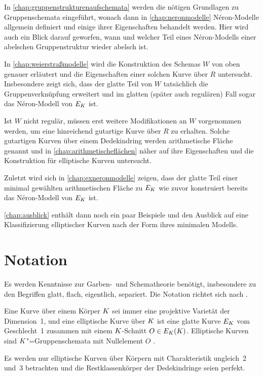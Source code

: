 In \autoref{chap:gruppenstrukturenaufschemata} werden die nötigen
Grundlagen zu Gruppenschemata eingeführt, wonach dann in
\autoref{chap:neronmodelle} Néron-Modelle allgemein definiert und
einige ihrer Eigenschaften behandelt werden.
Hier wird auch ein Blick darauf geworfen, wann und welcher Teil eines
Néron-Modells einer abelschen Gruppenstruktur wieder abelsch ist.

In \autoref{chap:weierstraßmodelle} wird die Konstruktion des Schemas
$W$ von oben genauer erläutert und die Eigenschaften einer solchen
Kurve über $R$ untersucht. Insbesondere zeigt sich, dass der glatte
Teil von $W$ tatsächlich die Gruppenverknüpfung erweitert 
und im glatten (später auch regulären) Fall sogar das
Néron-Modell von $E_{K}$ ist.

Ist $W$ nicht regulär, müssen erst weitere Modifikationen an $W$
vorgenommen werden, um eine hinreichend gutartige Kurve über $R$ zu
erhalten. Solche gutartigen Kurven über einem Dedekindring werden
arithmetische Fläche genannt und in
\autoref{chap:arithmetischeflächen} näher auf ihre Eigenschaften und
die Konstruktion für elliptische Kurven untersucht.

Zuletzt wird sich in \autoref{chap:exneronmodelle} zeigen, dass der
glatte Teil einer minimal gewählten arithmetischen Fläche zu $E_{K}$
wie zuvor konstruiert bereits das Néron-Modell von $E_{K}$ ist.

\autoref{chap:ausblick} enthält dann noch ein paar Beispiele und den
Ausblick auf eine Klassifizierung elliptischer Kurven nach der Form
ihres minimalen Modells.

\section*{Notation}
Es werden Kenntnisse zur Garben-~und Schematheorie benötigt,
insbesondere zu den Begriffen glatt, flach, eigentlich, separiert.
Die Notation richtet sich nach \cite{wedhorn}.

Eine Kurve über einem Körper $K$ sei immer eine projektive Varietät
der Dimension~1,
und eine elliptische Kurve über $K$ ist eine glatte Kurve $E_{K}$
vom Geschlecht~1 zusammen mit einem $K$-Schnitt $O\in E_{K}(K)$.
Elliptische Kurven sind $K$"=Gruppenschemata mit Nullelement $O$
\cite{silverman}.

Es werden nur elliptische Kurven über Körpern mit Charakteristik
ungleich~2 und~3 betrachten und die Restklassenkörper der
Dedekindringe seien perfekt.

